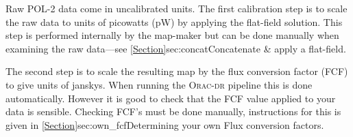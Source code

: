 Raw POL-2 data come in uncalibrated units. The first calibration
step is to scale the raw data to units of picowatts (pW)
by applying the flat-field solution. This step is performed internally
by the map-maker but can be done manually when examining the raw
data---see \cref{Section}{sec:concat}{Concatenate \& apply a
  flat-field}.

The second step is to scale the resulting map by the flux conversion factor
(FCF) to give units of janskys. When running the
\textsc{Orac-dr} pipeline this is done automatically.
However it is good to check that the FCF value applied to your data is sensible.
Checking FCF's must be done manually, instructions for this is
given in \cref{Section}{sec:own_fcf}{Determining your own Flux conversion
  factors}.


